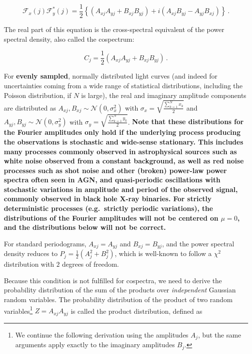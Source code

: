 \documentclass[12pt]{emulateapj}
\begin{document}
\begin{equation}
\mathcal{F}_x(j) \mathcal{F}_y^*(j) = \frac{1}{2} \left\{ (A_{xj}A_{yj} + B_{xj}B_{yj}) + i (A_{xj}B_{yj} - A_{yj}B_{xj}) \right\} \, .
\end{equation}

\noindent The real part of this equation is the cross-spectral equivalent of the power spectral density, also called the cospectrum:

\begin{equation}
C_j = \frac{1}{2}  (A_{xj}A_{yj} + B_{xj}B_{yj}) \, .
\end{equation}

\noindent For \textbf{evenly sampled}, normally distributed light curves (and indeed for uncertainties coming from a wide range of statistical distributions, including the Poisson distribution, if $N$ is large), the real and imaginary amplitude components are distributed as $A_{xj}, B_{xj} \sim \mathcal{N}(0, \sigma_x^2)$ with $\sigma_x =  \sqrt{\frac{\sum_{k=1}^{N}{x_k}}{2}}$ and  $A_{yj}, B_{yj} \sim \mathcal{N}(0, \sigma_y^2)$ with $\sigma_y = \sqrt{\frac{\sum_{k=1}^{N}{y_k}}{2}}$. \textbf{Note that these distributions for the Fourier amplitudes only hold if the underlying process producing the observations is stochastic and wide-sense stationary. This includes many processes commonly observed in astrophysical sources such as white noise observed from a constant background, as well as red noise processes such as shot noise and other (broken) power-law power spectra often seen in AGN, and quasi-periodic oscillations with stochastic variations in amplitude and period of the observed signal, commonly observed in black hole X-ray binaries. For strictly deterministic processes (e.g.\ strictly periodic variations), the distributions of the Fourier amplitudes will not be centered on $\mu = 0$, and the distributions below will not be correct.}

For standard periodograms, $A_{xj} = A_{yj}$ and $B_{xj} = B_{yj}$, and the power spectral density reduces to $P_j = \frac{1}{2} (A_j^2 + B_j^2)$, which is well-known to follow a $\chi^2$ distribution with $2$ degrees of freedom. 

Because this condition is not fulfilled for cospectra, we need to derive the probability distribution of the sum of the products over \textit{independent} Gaussian random variables. The probability distribution of the product of two random variables\footnote{We continue the following derivation using the amplitudes $A_j$, but the same arguments apply exactly to the imaginary amplitudes $B_j$.} $Z = A_{xj}A_{yj}$ is called the product distribution, defined as 
\end{document}
